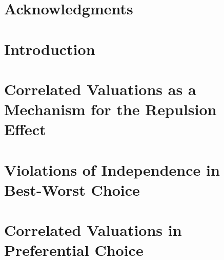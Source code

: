 \documentclass[dissertation]{umassthesis}          %
\begin{document}
\chapter{Acknowledgments}             %


\begin{abstract}  
\end{abstract}



\tableofcontents                %
\listoftables                   %
\listoffigures                  %


\mainmatter   %

\chapter{Introduction}
\label{introduction}


\chapter{Correlated Valuations as a Mechanism for the Repulsion Effect}
\label{chapter_2}


\chapter{Violations of Independence in Best-Worst Choice}
\label{chapter_3}


\chapter{Correlated Valuations in Preferential Choice}
\label{chapter_4}

\end{document}
